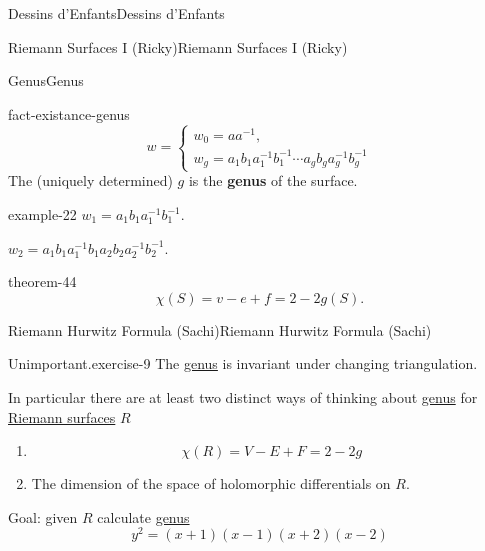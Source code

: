 \documentclass[10pt,]{book}
\newcommand{\terminology}[1]{\textbf{#1}}
\numberwithin{equation}{section}
\newcommand{\inv}{^{-1}}
\begin{document}
\begin{chapterptx}{Dessins d'Enfants}{}{Dessins d'Enfants}{}{}
\begin{sectionptx}{Riemann Surfaces I (Ricky)}{}{Riemann Surfaces I (Ricky)}{}{}
\begin{subsectionptx}{Genus}{}{Genus}{}{}
\begin{fact}{}{}{fact-existance-genus}
\begin{equation*}
w = \begin{cases} w_0 = aa\inv,\\ w_g = a_1b_1 a_1\inv b_1\inv \cdots a_gb_g a_g\inv b_g\inv\end{cases}
\end{equation*}
The (uniquely determined) \(g\) is the \terminology{genus} of the surface.%
\end{fact}
\begin{example}{}{example-22}%
\hypertarget{p-506}{}%
\(w_1 = a_1b_1 a_1\inv b_1 \inv\).%
\par
\hypertarget{p-507}{}%
\(w_2 = a_1b_1 a_1\inv b_1a_2b_2 a_2\inv b_2 \inv\).%
\end{example}
\begin{theorem}{}{}{theorem-44}%
\hypertarget{p-508}{}%
%
\begin{equation*}
\chi (S) = v- e + f = 2-2g(S)\text{.}
\end{equation*}
%
\end{theorem}
\end{subsectionptx}
\end{sectionptx}
%
%
\typeout{************************************************}
\typeout{************************************************}
%
\begin{sectionptx}{Riemann Hurwitz Formula (Sachi)}{}{Riemann Hurwitz Formula (Sachi)}{}{}\label{sec-riemann-hurwitz}
\begin{inlineexercise}{Unimportant.}{exercise-9}%
\hypertarget{p-509}{}%
The \hyperref[def-class-set]{genus} is invariant under changing triangulation.%
\end{inlineexercise}
\hypertarget{p-510}{}%
In particular there are at least two distinct ways of thinking about \hyperref[def-class-set]{genus} for \hyperref[def-top-riem-surface]{Riemann surfaces} \(R\)\leavevmode%
\begin{enumerate}
\item\hypertarget{li-101}{}%
\begin{equation*}
\chi(R) = V -E + F = 2-2g
\end{equation*}
%
\item\hypertarget{li-102}{}The dimension of the space of holomorphic differentials on \(R\).%
\end{enumerate}
%
\par
\hypertarget{p-511}{}%
Goal: given \(R\) calculate \hyperref[def-class-set]{genus}%
\begin{equation*}
y^2 = (x+1)(x-1)(x+2)(x-2)
\end{equation*}

\end{sectionptx}
\end{chapterptx}
\end{document}
